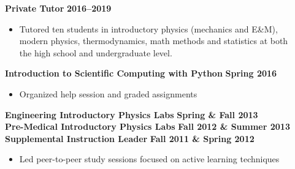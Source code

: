\documentclass[margin]{res}
\begin{document}
\begin{resume}
\textbf{Private Tutor} \hfill \textbf{2016--2019}
\begin{itemize}\itemsep -2pt
    \item[] Tutored ten students in introductory physics (mechanics and E\&M),\\modern physics, thermodynamics, math methods and statistics at both\\the high school and undergraduate level.
    \end{itemize} \vspace{-12pt}
\textbf{Introduction to Scientific Computing with Python} \hfill{} \textbf{Spring 2016}
    \begin{itemize}\itemsep -2pt
    \item[] Organized help session and graded assignments
    \end{itemize} \vspace{-12pt}
\textbf{Engineering Introductory Physics Labs} \hfill{} \textbf{Spring \& Fall 2013}\\
\textbf{Pre-Medical Introductory Physics Labs} \hfill{} \textbf{Fall 2012 \& Summer 2013}\\
{\bf Supplemental Instruction Leader} \hfill{} \textbf{Fall 2011 \& Spring 2012}
    \begin{itemize}\itemsep -2pt
    \item[] Led peer-to-peer study sessions focused on active learning techniques
    \end{itemize}



\end{resume}
\end{document}
